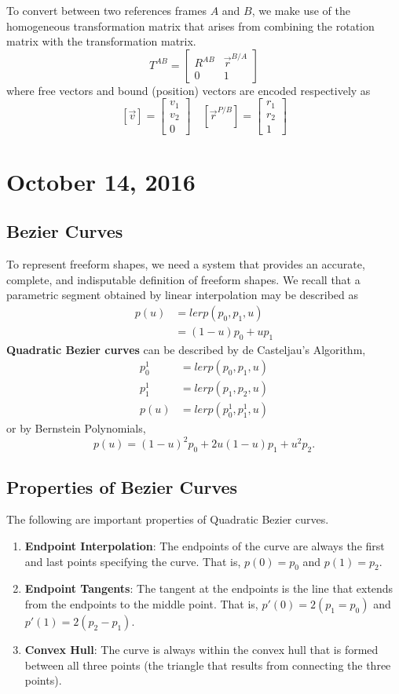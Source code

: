 \documentclass[11pt]{article}
\theoremstyle{plain} %
\theoremstyle{definition}
\theoremstyle{example}
\theoremstyle{remark}
\begin{document}
To convert between two references frames $A$ and $B$, we make use of the homogeneous transformation matrix that arises from combining the rotation matrix with the transformation matrix.
$$T^{AB} = \begin{bmatrix}R^{AB} & \vec{r}^{B/A} \\ 0 & 1\end{bmatrix}$$ where free vectors and bound (position) vectors are encoded respectively as 
$$\left[\vec{v}\right] = \begin{bmatrix}v_1 \\ v_2 \\ 0\end{bmatrix} \quad \left[\vec{r}^{P/B}\right] = \begin{bmatrix}r_1 \\ r_2 \\ 1\end{bmatrix}$$

\section{October 14, 2016}
\subsection{Bezier Curves}

To represent freeform shapes, we need a system that provides an accurate, complete, and indisputable definition of freeform shapes. We recall that a parametric segment obtained by linear interpolation may be described as 
\begin{align*}
p(u) &= lerp(p_0, p_1, u)\\
&= (1-u)p_0 + up_1
\end{align*}
\textbf{Quadratic Bezier curves} can be described by de Casteljau's Algorithm,
\begin{align*}
p_0^1 &= lerp(p_0, p_1, u)\\
p_1^1 &= lerp(p_1, p_2, u)\\
p(u) &= lerp\left(p_0^1, p_1^1, u\right)
\end{align*}
or by Bernstein Polynomials,
$$p(u) = (1-u)^2p_0 + 2u(1-u)p_1 + u^2p_2.$$

\subsection{Properties of Bezier Curves}

The following are important properties of Quadratic Bezier curves.
\begin{enumerate}
	\item \textbf{Endpoint Interpolation}: The endpoints of the curve are always the first and last points specifying the curve. That is, $p(0) = p_0$ and $p(1) = p_2$.
	\item \textbf{Endpoint Tangents}: The tangent at the endpoints is the line that extends from the endpoints to the middle point. That is, $p'(0) = 2(p_1=p_0)$ and $p'(1) = 2(p_2-p_1)$.
	\item \textbf{Convex Hull}: The curve is always within the convex hull that is formed between all three points (the triangle that results from connecting the three points).
\end{enumerate}
\end{document}
